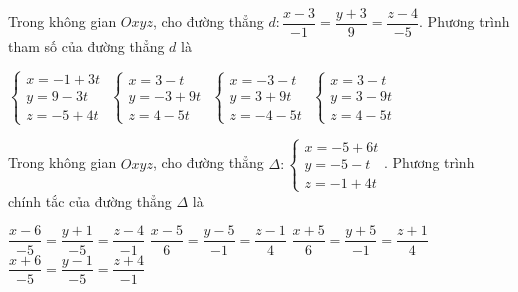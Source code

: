 \documentclass[12pt,a4paper]{article}
\begin{document}
\begin{ex}
 Trong không gian ${Oxyz}$, cho đường thẳng ${d}: \dfrac{x - 3}{-1}=\dfrac{y + 3}{9}=\dfrac{z - 4}{-5}$. Phương trình tham số của đường thẳng ${d}$ là
 
\choice
{ $\left\{ \begin{array}{l}x = -1+3t\\ y = 9-3t\\z = -5+4t\end{array} \right.$ }
   { \True $\left\{ \begin{array}{l}x = 3-t\\ y = -3+9t\\z = 4-5t\end{array} \right.$ }
     { $\left\{ \begin{array}{l}x = -3-t\\ y = 3+9t\\z = -4-5t\end{array} \right.$ }
    { $\left\{ \begin{array}{l}x = 3-t\\ y = 3-9t\\z = 4-5t\end{array} \right.$ }
\end{ex}

\begin{ex}
 Trong không gian ${Oxyz}$, cho đường thẳng ${\Delta}:\left\{ \begin{array}{l}x = -5+6t\\ y = -5-t\\z = -1+4t\end{array} \right.$. Phương trình chính tắc của đường thẳng ${\Delta}$ là
 
\choice
{ $\dfrac{x - 6}{-5}=\dfrac{y + 1}{-5}=\dfrac{z - 4}{-1}$ }
   { $\dfrac{x - 5}{6}=\dfrac{y - 5}{-1}=\dfrac{z - 1}{4}$ }
     { \True $\dfrac{x + 5}{6}=\dfrac{y + 5}{-1}=\dfrac{z + 1}{4}$ }
    { $\dfrac{x + 6}{-5}=\dfrac{y - 1}{-5}=\dfrac{z + 4}{-1}$ }
\end{ex}
\end{document}
